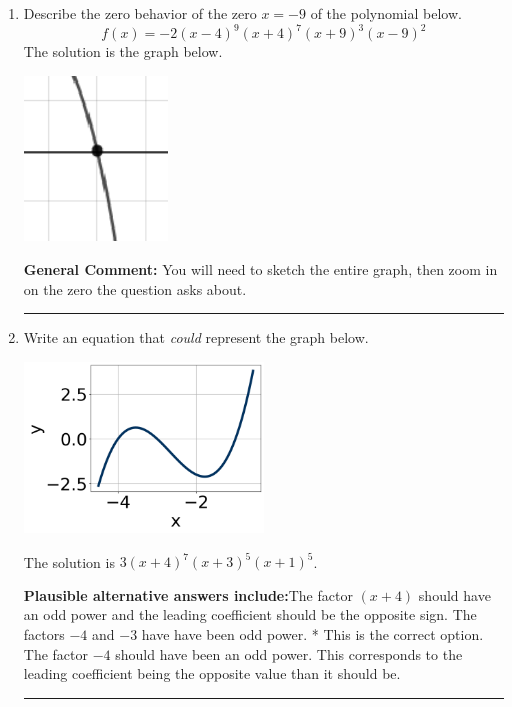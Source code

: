 \documentclass{extbook}[14pt]
\newcommand{\litem}[1]{\item #1

\rule{\textwidth}{0.4pt}}
\begin{document}
\begin{enumerate}\litem{
Describe the zero behavior of the zero $x = -9$ of the polynomial below.
\[ f(x) = -2(x - 4)^{9}(x + 4)^{7}(x + 9)^{3}(x - 9)^{2} \]The solution is the graph below.
    \begin{center}
        \includegraphics[width=0.3\textwidth]{../Figures/polyZeroBehaviorAC.png}
    \end{center}

\textbf{General Comment:} You will need to sketch the entire graph, then zoom in on the zero the question asks about.
}
\litem{
Write an equation that \textit{could} represent the graph below.

\begin{center}
    \includegraphics[width=0.5\textwidth]{../Figures/polyGraphToFunctionC.png}
\end{center}


The solution is \( 3(x + 4)^{7} (x + 3)^{5} (x + 1)^{5} \).\begin{enumerate}[label=\Alph*.]
\textbf{Plausible alternative answers include:}The factor $(x + 4)$ should have an odd power and the leading coefficient should be the opposite sign.
The factors $-4$ and $-3$ have have been odd power.
* This is the correct option.
The factor $-4$ should have been an odd power.
This corresponds to the leading coefficient being the opposite value than it should be.
\end{enumerate}

}
\end{enumerate}
\end{document}
